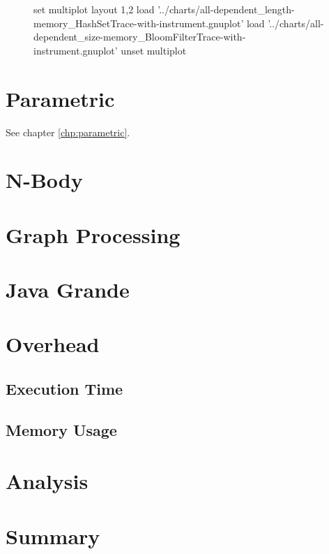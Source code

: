 	\begin{figure}[H]
		\begin{gnuplot}[terminal=pdf]
		set multiplot layout 1,2
			load '../charts/all-dependent_length-memory_HashSetTrace-with-instrument.gnuplot'
			load '../charts/all-dependent_size-memory_BloomFilterTrace-with-instrument.gnuplot'
					unset multiplot
		\end{gnuplot}
	\end{figure}

\section{Parametric} \label{sec:results/parametric}
See chapter \ref{chp:parametric}.

\section{N-Body} \label{sec:results/nbody}

\section{Graph Processing} \label{sec:results/graph}

\section{Java Grande} \label{sec:results/grande}

\section{Overhead} \label{sec:results/overhead}
	\subsection{Execution Time} \label{sec:results/overhead/time}
	
	\subsection{Memory Usage} \label{sec:results/overhead/memory}

\section{Analysis} \label{sec:results/analysis}

\section{Summary} \label{sec:results/summary}